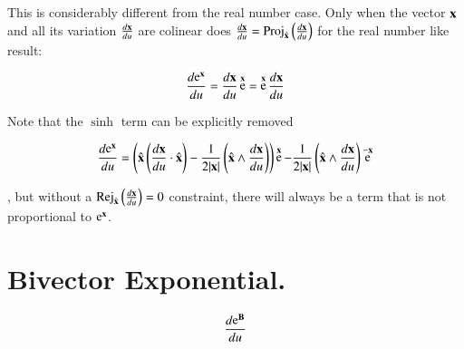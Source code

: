 \documentclass{article}      %
\DeclareMathOperator{\Exp}{e}
\DeclareMathOperator{\Rej}{Rej}
\newcommand{\ddu}[1] {\frac {d{#1}} {du}}
\begin{document}
This is considerably different from the real number case.  Only when the vector $\mathbf{x}$ and all its variation
$\ddu{\Bx}$ are colinear does $\ddu{\Bx} = \Proj_{\xcap}\left(\ddu{\Bx}\right)$ for the real number like result:

\begin{equation}
\ddu{\Exp^{\Bx}} = \ddu{\Bx} \Exp^{\Bx} = \Exp^{\Bx} \ddu{\Bx} 
\end{equation}

Note that the $\sinh$ term can be explicitly removed

\begin{align*}
\ddu{\Exp^{\Bx}} 
=
\left(\xcap \left(\ddu{\Bx} \cdot \xcap\right) - \inv{2\abs\Bx}\left(\xcap \wedge \ddu{\Bx} \right) \right) \Exp^{\Bx}
 - \inv{2\abs\Bx}\left(\xcap \wedge \ddu{\Bx} \right) \Exp^{-\Bx} \\
\end{align*}

, but without a $\Rej_{\xcap}\left(\ddu{\Bx}\right) = 0$
constraint, there will always be a term that is not proportional to $\Exp^{\Bx}$.

\section{ Bivector Exponential. }

\begin{align*}
\ddu{\Exp^{\BB}} 
\end{align*}
\end{document}
